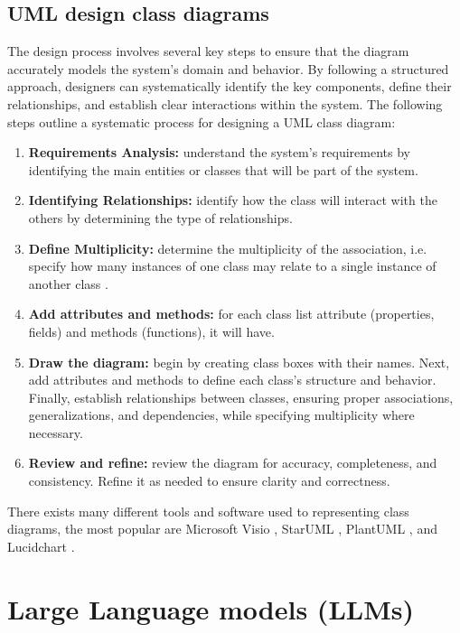 \subsection{UML design class diagrams}
The design process involves several key steps to ensure that the diagram accurately models the system's domain and behavior. By following a structured approach, designers can systematically identify the key components, define their relationships, and establish clear interactions within the system. The following steps outline a systematic process for designing a UML class diagram:
\begin{enumerate}
    \item \textbf{Requirements Analysis:} understand the system's requirements by identifying the main entities or classes that will be part of the system.
    \item \textbf{Identifying Relationships:} identify how the class will interact with the others by determining the type of relationships.
    \item \textbf{Define Multiplicity:} determine the multiplicity of the association, i.e. specify how many instances of one class may relate to a single instance of another class \cite{5BGomaa2011}.
    \item \textbf{Add attributes and methods:} for each class list attribute (properties, fields) and methods (functions), it will have.
    \item \textbf{Draw the diagram:} begin by creating class boxes with their names. Next, add attributes and methods to define each class's structure and behavior. Finally, establish relationships between classes, ensuring proper associations, generalizations, and dependencies, while specifying multiplicity where necessary.
    \item \textbf{Review and refine:} review the diagram for accuracy, completeness, and consistency. Refine it as needed to ensure clarity and correctness.
 \end{enumerate}

There exists many different tools and software used to representing class diagrams, the most popular are Microsoft Visio \cite{microsoft_visio}, StarUML \cite{staruml}, PlantUML \cite{plantuml}, and Lucidchart \cite{lucidchart}.


\section{Large Language models (LLMs)}
\label{sec:large_language_models_llms}

